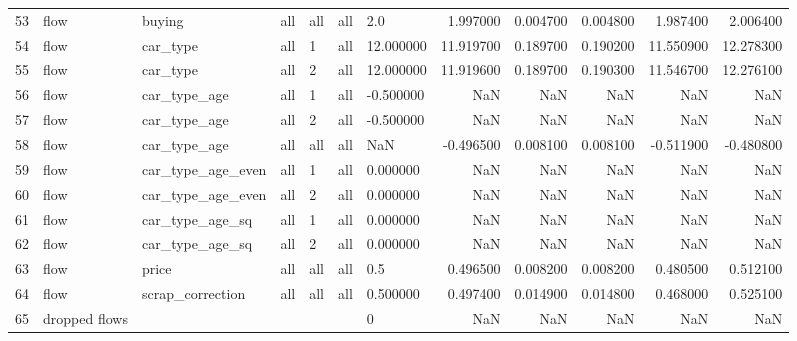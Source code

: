 \begin{tabular}{lllllllrrrrr}
53 & flow & buying & all & all & all & 2.0 & 1.997000 & 0.004700 & 0.004800 & 1.987400 & 2.006400 \\
54 & flow & car_type & all & 1 & all & 12.000000 & 11.919700 & 0.189700 & 0.190200 & 11.550900 & 12.278300 \\
55 & flow & car_type & all & 2 & all & 12.000000 & 11.919600 & 0.189700 & 0.190300 & 11.546700 & 12.276100 \\
56 & flow & car_type_age & all & 1 & all & -0.500000 & NaN & NaN & NaN & NaN & NaN \\
57 & flow & car_type_age & all & 2 & all & -0.500000 & NaN & NaN & NaN & NaN & NaN \\
58 & flow & car_type_age & all & all & all & NaN & -0.496500 & 0.008100 & 0.008100 & -0.511900 & -0.480800 \\
59 & flow & car_type_age_even & all & 1 & all & 0.000000 & NaN & NaN & NaN & NaN & NaN \\
60 & flow & car_type_age_even & all & 2 & all & 0.000000 & NaN & NaN & NaN & NaN & NaN \\
61 & flow & car_type_age_sq & all & 1 & all & 0.000000 & NaN & NaN & NaN & NaN & NaN \\
62 & flow & car_type_age_sq & all & 2 & all & 0.000000 & NaN & NaN & NaN & NaN & NaN \\
63 & flow & price & all & all & all & 0.5 & 0.496500 & 0.008200 & 0.008200 & 0.480500 & 0.512100 \\
64 & flow & scrap_correction & all & all & all & 0.500000 & 0.497400 & 0.014900 & 0.014800 & 0.468000 & 0.525100 \\
65 & dropped flows &  &  &  &  & 0 & NaN & NaN & NaN & NaN & NaN \\
\bottomrule
\end{tabular}
